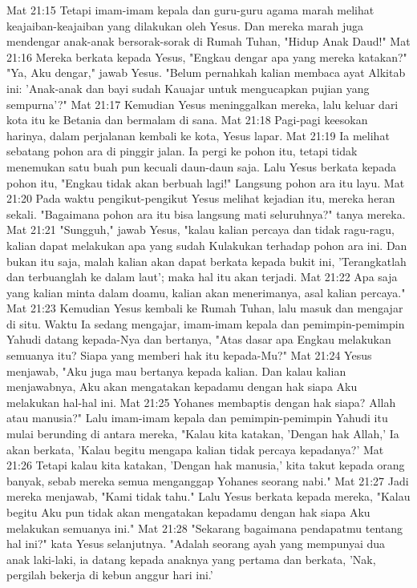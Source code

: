Mat 21:15  Tetapi imam-imam kepala dan guru-guru agama marah melihat keajaiban-keajaiban yang dilakukan oleh Yesus. Dan mereka marah juga mendengar anak-anak bersorak-sorak di Rumah Tuhan, "Hidup Anak Daud!"
Mat 21:16  Mereka berkata kepada Yesus, "Engkau dengar apa yang mereka katakan?" "Ya, Aku dengar," jawab Yesus. "Belum pernahkah kalian membaca ayat Alkitab ini: 'Anak-anak dan bayi sudah Kauajar untuk mengucapkan pujian yang sempurna'?"
Mat 21:17  Kemudian Yesus meninggalkan mereka, lalu keluar dari kota itu ke Betania dan bermalam di sana.
Mat 21:18  Pagi-pagi keesokan harinya, dalam perjalanan kembali ke kota, Yesus lapar.
Mat 21:19  Ia melihat sebatang pohon ara di pinggir jalan. Ia pergi ke pohon itu, tetapi tidak menemukan satu buah pun kecuali daun-daun saja. Lalu Yesus berkata kepada pohon itu, "Engkau tidak akan berbuah lagi!" Langsung pohon ara itu layu.
Mat 21:20  Pada waktu pengikut-pengikut Yesus melihat kejadian itu, mereka heran sekali. "Bagaimana pohon ara itu bisa langsung mati seluruhnya?" tanya mereka.
Mat 21:21  "Sungguh," jawab Yesus, "kalau kalian percaya dan tidak ragu-ragu, kalian dapat melakukan apa yang sudah Kulakukan terhadap pohon ara ini. Dan bukan itu saja, malah kalian akan dapat berkata kepada bukit ini, 'Terangkatlah dan terbuanglah ke dalam laut'; maka hal itu akan terjadi.
Mat 21:22  Apa saja yang kalian minta dalam doamu, kalian akan menerimanya, asal kalian percaya."
Mat 21:23  Kemudian Yesus kembali ke Rumah Tuhan, lalu masuk dan mengajar di situ. Waktu Ia sedang mengajar, imam-imam kepala dan pemimpin-pemimpin Yahudi datang kepada-Nya dan bertanya, "Atas dasar apa Engkau melakukan semuanya itu? Siapa yang memberi hak itu kepada-Mu?"
Mat 21:24  Yesus menjawab, "Aku juga mau bertanya kepada kalian. Dan kalau kalian menjawabnya, Aku akan mengatakan kepadamu dengan hak siapa Aku melakukan hal-hal ini.
Mat 21:25  Yohanes membaptis dengan hak siapa? Allah atau manusia?" Lalu imam-imam kepala dan pemimpin-pemimpin Yahudi itu mulai berunding di antara mereka, "Kalau kita katakan, 'Dengan hak Allah,' Ia akan berkata, 'Kalau begitu mengapa kalian tidak percaya kepadanya?'
Mat 21:26  Tetapi kalau kita katakan, 'Dengan hak manusia,' kita takut kepada orang banyak, sebab mereka semua menganggap Yohanes seorang nabi."
Mat 21:27  Jadi mereka menjawab, "Kami tidak tahu." Lalu Yesus berkata kepada mereka, "Kalau begitu Aku pun tidak akan mengatakan kepadamu dengan hak siapa Aku melakukan semuanya ini."
Mat 21:28  "Sekarang bagaimana pendapatmu tentang hal ini?" kata Yesus selanjutnya. "Adalah seorang ayah yang mempunyai dua anak laki-laki, ia datang kepada anaknya yang pertama dan berkata, 'Nak, pergilah bekerja di kebun anggur hari ini.'
